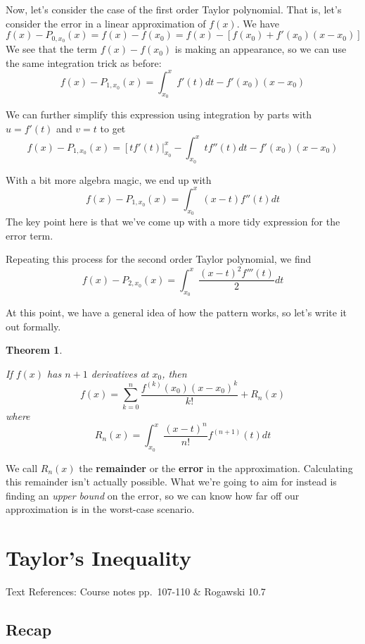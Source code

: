\documentclass[
]{book}
\newtheorem{theorem}{Theorem}[chapter]
\theoremstyle{definition}
\theoremstyle{definition}
\theoremstyle{definition}
\theoremstyle{definition}
\theoremstyle{remark}
\begin{document}
Now, let's consider the case of the first order Taylor polynomial. That is, let's consider the error in a linear approximation of \(f(x)\). We have \[f(x)-P_{0,x_0}(x)=f(x)-f(x_0)=f(x)- [f(x_0)+f'(x_0)(x-x_0)]\]
We see that the term \(f(x)-f(x_0)\) is making an appearance, so we can use the same integration trick as before: \[f(x)-P_{1,x_0}(x)=\int_{x_0}^x f'(t)dt-f'(x_0)(x-x_0)\]

We can further simplify this expression using integration by parts with \(u=f'(t)\) and \(v=t\) to get \[ f(x)-P_{1,x_0}(x)=\left[ t f'(t)\right |_{x_0}^x-\int_{x_0}^x tf''(t)dt - f'(x_0)(x-x_0)\]

With a bit more algebra magic, we end up with \[f(x)-P_{1,x_0}(x)=\int_{x_0}^x (x-t)f''(t)dt\]
The key point here is that we've come up with a more tidy expression for the error term.

Repeating this process for the second order Taylor polynomial, we find \[f(x)-P_{2,x_0}(x)=\int_{x_0}^x \frac{(x-t)^2f'''(t)}{2}dt\]

At this point, we have a general idea of how the pattern works, so let's write it out formally.

\begin{theorem}
\protect\hypertarget{thm:unlabeled-div-161}{}\label{thm:unlabeled-div-161}

If \(f(x)\) has \(n+1\) derivatives at \(x_0\), then \[f(x)=\sum_{k=0}^n \frac{f^{(k)}(x_0)(x-x_0)^k}{k!}+R_n(x)\] where \[R_n(x)=\int_{x_0}^x\frac{(x-t)^n}{n!}f^{(n+1)}(t)dt\]

\end{theorem}

We call \(R_n(x)\) the \textbf{remainder} or the \textbf{error} in the approximation. Calculating this remainder isn't actually possible. What we're going to aim for instead is finding an \emph{upper bound} on the error, so we can know how far off our approximation is in the worst-case scenario.

\hypertarget{lec-23}{%
\chapter{Taylor's Inequality}\label{lec-23}}

Text References: Course notes pp.~107-110 \& Rogawski 10.7

\hypertarget{recap-21}{%
\section{Recap}\label{recap-21}}
\end{document}
